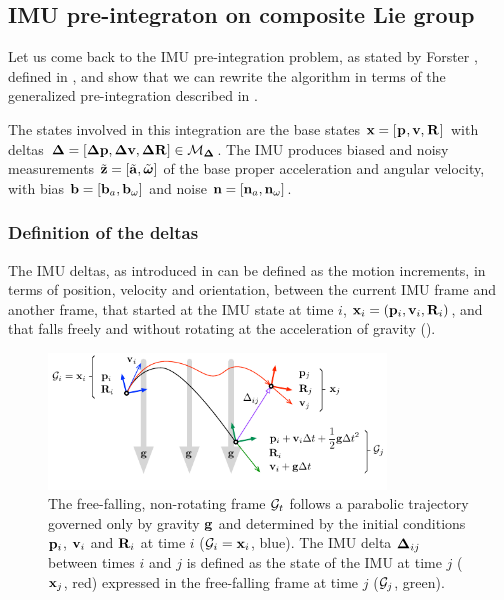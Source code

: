 \subsection{IMU pre-integraton on composite Lie group}
\label{sec:imu_preint_composite}

Let us come back to the IMU pre-integration problem, as stated by Forster \cite{lupton-09, forster2015imu}, defined in , and show that we 
can rewrite the algorithm in terms of the generalized pre-integration described in .

The states involved in this integration are the base states ${\bf x} = [\prescript{}{}{{\bf p}}_{}, {\bf v}, \prescript{}{}{{\bf R}}_{}]$ with deltas ${{\bm \Delta}}=[{\bm \Delta {\bf p}},{\bm \Delta {\bf v}},{\bm \Delta {\bf R}}] \in \mathcal{M}_{{{\bm \Delta}}}$. 
The IMU produces biased and noisy measurements $\tilde{{\bf z}} = [\tilde{{\bf a}}, \tilde{{\bm \omega}}]$ of the base proper acceleration and angular velocity, 
with bias ${\bf b} = [{\bf b}_{a}, {\bf b}_{\omega}]$ and noise ${\bf n} = [{\bf n}_{a}, {\bf n}_{\omega}]$. 


\subsubsection{Definition of the deltas}

The IMU deltas, as introduced in \cite{lupton-09, forster2015imu} can be defined \cite{atchuthan-18-thesis} as the motion increments, in terms of position, velocity and orientation, 
between the current IMU frame and another frame, that started at the IMU state at time $i$, ${\bf x}_i=({\bf p}_i,{\bf v}_i,{\bf R}_i)$, and that falls freely and without rotating at 
the acceleration of gravity ().

\begin{figure}[t]
    \centering
    \includegraphics[width=0.8\textwidth]{figures/fff}
    \caption{The free-falling, non-rotating frame $\mathcal{G}_t$ follows a parabolic trajectory governed only by gravity ${\bf g}$ and determined by the initial conditions 
    ${\bf p}_i$, ${\bf v}_i$ and ${\bf R}_i$ at time $i$ ($\mathcal{G}_i={\bf x}_i$, blue). The IMU delta ${{\bm \Delta}}_{ij}$ between times $i$ and $j$ is defined as the state of the IMU at time 
    $j$ (${\bf x}_j$, red) expressed in the free-falling frame at time $j$ ($\mathcal{G}_j$, green).}
    \label{fig:fff}
\end{figure}

